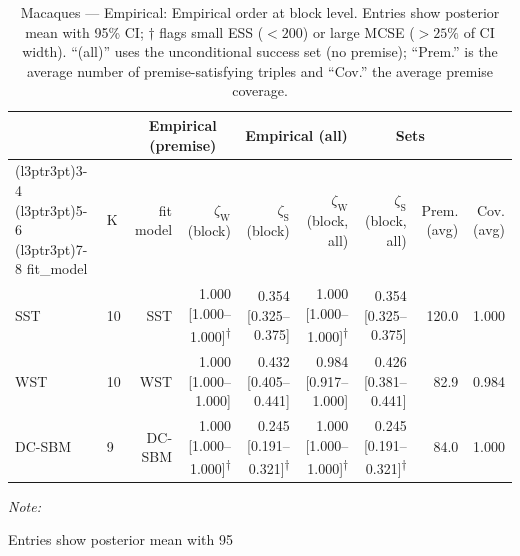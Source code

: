 \begin{table}
\centering
\caption{\label{tab:tab:macaques-empirical-emp-block}Macaques — Empirical: Empirical order at block level. Entries show posterior mean with 95\% CI; $\dagger$ flags small ESS ($<200$) or large MCSE ($>25\%$ of CI width). “(all)” uses the unconditional success set (no premise); “Prem.” is the average number of premise-satisfying triples and “Cov.” the average premise coverage.}
\centering
\begin{threeparttable}
\begin{tabular}[t]{llrrrrrrr}
\toprule
\multicolumn{2}{c}{ } & \multicolumn{2}{c}{Empirical (premise)} & \multicolumn{2}{c}{Empirical (all)} & \multicolumn{2}{c}{Sets} \\
\cmidrule(l{3pt}r{3pt}){3-4} \cmidrule(l{3pt}r{3pt}){5-6} \cmidrule(l{3pt}r{3pt}){7-8}
fit_model & K & fit model & $\zeta_{\mathrm{W}}$ (block) & $\zeta_{\mathrm{S}}$ (block) & $\zeta_{\mathrm{W}}$ (block, all) & $\zeta_{\mathrm{S}}$ (block, all) & Prem. (avg) & Cov. (avg)\\
\midrule
SST & 10 & SST & 1.000 [1.000--1.000]\textsuperscript{$\dagger$} & 0.354 [0.325--0.375] & 1.000 [1.000--1.000]\textsuperscript{$\dagger$} & 0.354 [0.325--0.375] & 120.0 & 1.000\\
WST & 10 & WST & 1.000 [1.000--1.000] & 0.432 [0.405--0.441] & 0.984 [0.917--1.000] & 0.426 [0.381--0.441] & 82.9 & 0.984\\
DC-SBM & 9 & DC-SBM & 1.000 [1.000--1.000]\textsuperscript{$\dagger$} & 0.245 [0.191--0.321]\textsuperscript{$\dagger$} & 1.000 [1.000--1.000]\textsuperscript{$\dagger$} & 0.245 [0.191--0.321]\textsuperscript{$\dagger$} & 84.0 & 1.000\\
\bottomrule
\end{tabular}
\begin{tablenotes}
\item \textit{Note: } 
\item Entries show posterior mean with 95%
\end{tablenotes}
\end{threeparttable}
\end{table}